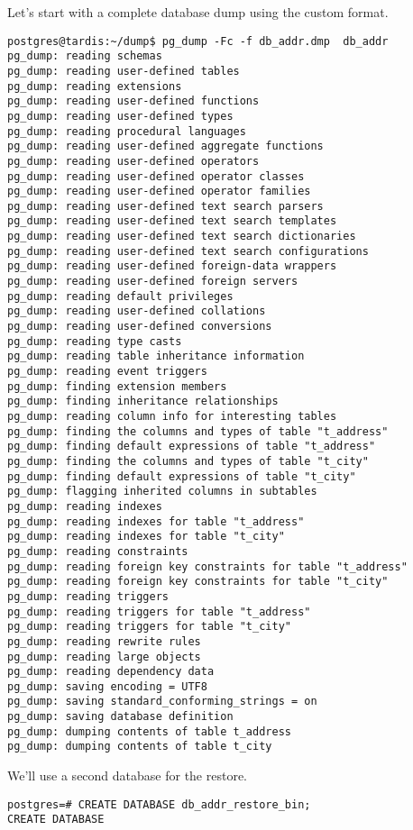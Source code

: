 Let's start with a complete database dump using the custom format. 

\begin{verbatim}
postgres@tardis:~/dump$ pg_dump -Fc -f db_addr.dmp  db_addr
pg_dump: reading schemas
pg_dump: reading user-defined tables
pg_dump: reading extensions
pg_dump: reading user-defined functions
pg_dump: reading user-defined types
pg_dump: reading procedural languages
pg_dump: reading user-defined aggregate functions
pg_dump: reading user-defined operators
pg_dump: reading user-defined operator classes
pg_dump: reading user-defined operator families
pg_dump: reading user-defined text search parsers
pg_dump: reading user-defined text search templates
pg_dump: reading user-defined text search dictionaries
pg_dump: reading user-defined text search configurations
pg_dump: reading user-defined foreign-data wrappers
pg_dump: reading user-defined foreign servers
pg_dump: reading default privileges
pg_dump: reading user-defined collations
pg_dump: reading user-defined conversions
pg_dump: reading type casts
pg_dump: reading table inheritance information
pg_dump: reading event triggers
pg_dump: finding extension members
pg_dump: finding inheritance relationships
pg_dump: reading column info for interesting tables
pg_dump: finding the columns and types of table "t_address"
pg_dump: finding default expressions of table "t_address"
pg_dump: finding the columns and types of table "t_city"
pg_dump: finding default expressions of table "t_city"
pg_dump: flagging inherited columns in subtables
pg_dump: reading indexes
pg_dump: reading indexes for table "t_address"
pg_dump: reading indexes for table "t_city"
pg_dump: reading constraints
pg_dump: reading foreign key constraints for table "t_address"
pg_dump: reading foreign key constraints for table "t_city"
pg_dump: reading triggers
pg_dump: reading triggers for table "t_address"
pg_dump: reading triggers for table "t_city"
pg_dump: reading rewrite rules
pg_dump: reading large objects
pg_dump: reading dependency data
pg_dump: saving encoding = UTF8
pg_dump: saving standard_conforming_strings = on
pg_dump: saving database definition
pg_dump: dumping contents of table t_address
pg_dump: dumping contents of table t_city

\end{verbatim}

We'll use a second database for the restore.

\begin{lstlisting}[style=pgsql]
postgres=# CREATE DATABASE db_addr_restore_bin;
CREATE DATABASE

\end{lstlisting}

